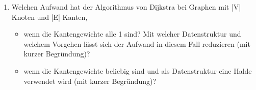 \documentclass{lehramt-informatik-aufgabe}
\begin{document}
\begin{enumerate}

\item Welchen Aufwand hat der Algorithmus von Dijkstra bei Graphen mit
|V| Knoten und |E| Kanten,

\begin{itemize}
\item wenn die Kantengewichte alle 1 sind? Mit welcher Datenstruktur und
welchem Vorgehen lässt sich der Aufwand in diesem Fall reduzieren (mit
kurzer Begründung)?

\item wenn die Kantengewichte beliebig sind und als Datenstruktur eine
Halde verwendet wird (mit kurzer Begründung)?
\end{itemize}

\end{enumerate}
\end{document}
